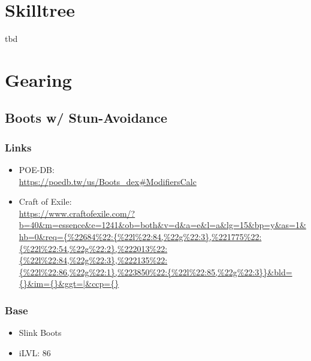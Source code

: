 \section{Skilltree}
tbd

\section{Gearing}
\subsection{Boots w/ Stun-Avoidance}
\subsubsection{Links}
\begin{itemize}
	\item POE-DB:\\
		\url{https://poedb.tw/us/Boots_dex#ModifiersCalc}
	
	\item Craft of Exile:\\
		\url{https://www.craftofexile.com/?b=40&m=essence&e=1241&ob=both&v=d&a=e&l=a&lg=15&bp=y&as=1&hb=0&req={%
\end{itemize}

\subsubsection{Base}
\begin{itemize}
	\item Slink Boots
	\item iLVL: 86
\end{itemize}

